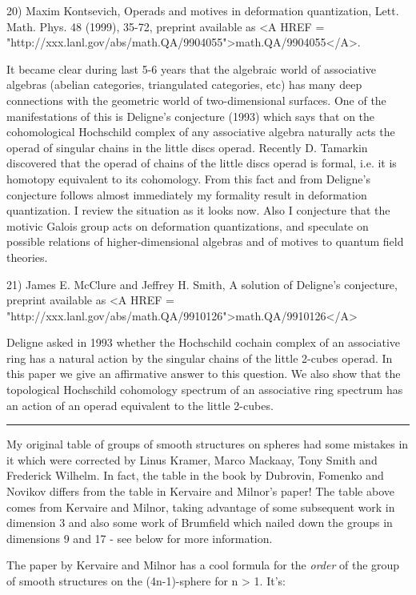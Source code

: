 20) Maxim Kontsevich, Operads and motives in deformation quantization,
Lett. Math. Phys. 48 (1999), 35-72, preprint available as
<A HREF = "http://xxx.lanl.gov/abs/math.QA/9904055">math.QA/9904055</A>.

It became clear during last 5-6 years that the algebraic world of 
associative algebras (abelian categories, triangulated categories, etc) 
has many deep connections with the geometric world of two-dimensional 
surfaces.  One of the manifestations of this is Deligne's conjecture 
(1993) which says that on the cohomological Hochschild complex of any 
associative algebra naturally acts the operad of singular chains in 
the little discs operad.  Recently D. Tamarkin discovered that the 
operad of chains of the little discs operad is formal, i.e. it is 
homotopy equivalent to its cohomology.  From this fact and from Deligne's
conjecture follows almost immediately my formality result in deformation
quantization.  I review the situation as it looks now.  Also I conjecture 
that the motivic Galois group acts on deformation quantizations, and 
speculate on possible relations of higher-dimensional algebras and of 
motives to quantum field theories.

21) James E. McClure and Jeffrey H. Smith, A solution of Deligne's 
conjecture, preprint available as 
<A HREF = "http://xxx.lanl.gov/abs/math.QA/9910126">math.QA/9910126</A>

Deligne asked in 1993 whether the Hochschild cochain complex of an
associative ring has a natural action by the singular chains of the little
2-cubes operad. In this paper we give an affirmative answer to this question.
We also show that the topological Hochschild cohomology spectrum of an
associative ring spectrum has an action of an operad equivalent to the little
2-cubes.

\par\noindent\rule{\textwidth}{0.4pt}
My original table of groups of smooth structures on spheres had some
mistakes in it which were corrected by Linus Kramer, Marco Mackaay, Tony
Smith and Frederick Wilhelm.  In fact, the table in the book by
Dubrovin, Fomenko and Novikov differs from the table in Kervaire and
Milnor's paper!  The table above comes from Kervaire and Milnor, taking
advantage of some subsequent work in dimension 3 and also some work of
Brumfield which nailed down the groups in dimensions 9 and 17 - see below
for more information.

The paper by Kervaire and Milnor has a cool formula
for the \emph{order} of the group of smooth structures on the (4n-1)-sphere
for n > 1.  It's:

